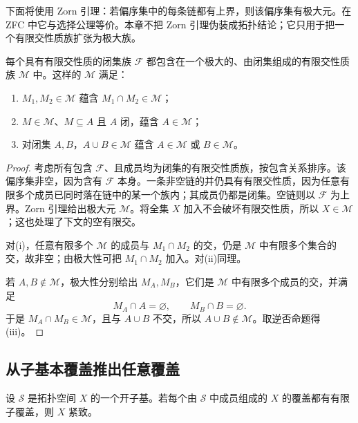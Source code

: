 下面将使用 Zorn 引理：若偏序集中的每条链都有上界，则该偏序集有极大元。在 ZFC 中它与选择公理等价。本章不把 Zorn 引理伪装成拓扑结论；它只用于把一个有限交性质族扩张为极大族。

\begin{lemma}[极大闭集有限交族]
\label{lem:maximal-fip-family}
每个具有有限交性质的闭集族 \(\mathcal F\) 都包含在一个极大的、由闭集组成的有限交性质族 \(\mathcal M\) 中。这样的 \(\mathcal M\) 满足：
\begin{enumerate}[label=\textup{(\roman*)}]
 \item \(M_1,M_2\in\mathcal M\) 蕴含 \(M_1\cap M_2\in\mathcal M\)；
 \item \(M\in\mathcal M\)、\(M\subseteq A\) 且 \(A\) 闭，蕴含 \(A\in\mathcal M\)；
 \item 对闭集 \(A,B\)，\(A\cup B\in\mathcal M\) 蕴含 \(A\in\mathcal M\) 或 \(B\in\mathcal M\)。
\end{enumerate}
\end{lemma}

\begin{proof}
考虑所有包含 \(\mathcal F\)、且成员均为闭集的有限交性质族，按包含关系排序。该偏序集非空，因为含有 \(\mathcal F\) 本身。一条非空链的并仍具有有限交性质，因为任意有限多个成员已同时落在链中的某一个族内；其成员仍都是闭集。空链则以 \(\mathcal F\) 为上界。Zorn 引理给出极大元 \(\mathcal M\)。将全集 \(X\) 加入不会破坏有限交性质，所以 \(X\in\mathcal M\)；这也处理了下文的空有限交。

对(i)，任意有限多个 \(\mathcal M\) 的成员与 \(M_1\cap M_2\) 的交，仍是 \(\mathcal M\) 中有限多个集合的交，故非空；由极大性可把 \(M_1\cap M_2\) 加入。对(ii)同理。

若 \(A,B\notin\mathcal M\)，极大性分别给出 \(M_A,M_B\)，它们是 \(\mathcal M\) 中有限多个成员的交，并满足
\[
 M_A\cap A=\varnothing,\qquad M_B\cap B=\varnothing.
\]
于是 \(M_A\cap M_B\in\mathcal M\)，且与 \(A\cup B\) 不交，所以
\(A\cup B\notin\mathcal M\)。取逆否命题得(iii)。
\end{proof}

\subsection{从子基本覆盖推出任意覆盖}

\begin{theorem}
\label{thm:alexander-subbasis}
设 \(\mathcal S\) 是拓扑空间 \(X\) 的一个开子基。若每个由 \(\mathcal S\) 中成员组成的 \(X\) 的覆盖都有有限子覆盖，则 \(X\) 紧致。
\end{theorem}

